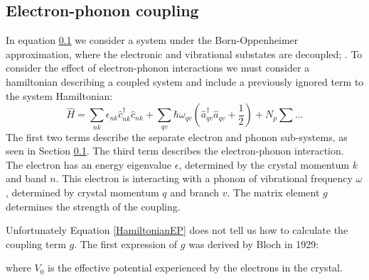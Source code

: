 

\subsection{Electron-phonon coupling}
In equation \ref{} we consider a system under the Born-Oppenheimer approximation, where the electronic and vibrational substates are decoupled; $ $.%
To consider the effect of electron-phonon interactions we must consider a hamiltonian describing a coupled system and include a previously ignored term to the system Hamiltonian:\cite{Giustino2016}
\begin{equation} \label{HamiltonianEP}
    \hat{H} = \sum_{nk}\epsilon_{nk}\hat{c}^{\dagger}_{nk}\hat{c}_{nk} + \sum_{qv}\hbar\omega_{qv}(\hat{a}^{\dagger}_{qv}\hat{a}_{qv}+\frac{1}{2})+N_p\sum...
\end{equation}
The first two terms describe the separate electron and phonon sub-systems, as seen in Section \ref{}. The third term describes the electron-phonon interaction. The electron has an energy eigenvalue $\epsilon$, determined by the crystal momentum $k$ and band $n$. This electron is interacting with a phonon of vibrational frequency $\omega$  , determined by crystal momentum $q$ and branch $v$. The matrix element $g$ determines the strength of the coupling. 

Unfortunately Equation \ref{HamiltonianEP} does not tell us how to calculate the coupling term $g$. The first expression of $g$ was derived by Bloch in 1929:
    
where $V_0$ is the effective potential experienced by the electrons in the crystal.

